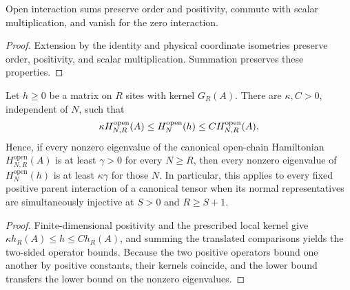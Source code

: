 \begin{lemma}
    \label{lem:open_local_interaction_sum_properties}
    \leanok
    Open interaction sums preserve order and positivity, commute with
    scalar multiplication, and vanish for the zero interaction.
\end{lemma}
\begin{proof}\leanok
    Extension by the identity and physical coordinate isometries preserve
    order, positivity, and scalar multiplication. Summation preserves
    these properties.
\end{proof}

\begin{lemma}
    \label{thm:open_positive_parent_gap}
    \leanok
    Let $h\geq0$ be a matrix on $R$ sites with kernel $G_R(A)$.
    There are $\kappa,C>0$, independent of $N$, such that
    \begin{align}
        \kappa H^{\mathrm{open}}_{N,R}(A)
        \leq H^{\mathrm{open}}_N(h)
        \leq C H^{\mathrm{open}}_{N,R}(A).
        \notag
    \end{align}
    Hence, if every nonzero eigenvalue of the canonical open-chain
    Hamiltonian $H^{\mathrm{open}}_{N,R}(A)$ is at least $\gamma>0$ for
    every $N\geq R$, then every nonzero eigenvalue of
    $H^{\mathrm{open}}_N(h)$ is at least $\kappa\gamma$ for those $N$.
    In particular, this applies to every fixed positive
    parent interaction of a canonical tensor when its normal representatives
    are simultaneously injective at $S>0$ and $R\geq S+1$.
\end{lemma}
\begin{proof}\leanok
    Finite-dimensional positivity and the prescribed local kernel give
    $\kappa h_R(A)\leq h\leq C h_R(A)$, and summing the translated
    comparisons yields the two-sided operator bounds. Because the two positive
    operators bound one another by positive constants, their kernels coincide,
    and the lower bound transfers the lower bound on the nonzero eigenvalues.
\end{proof}


